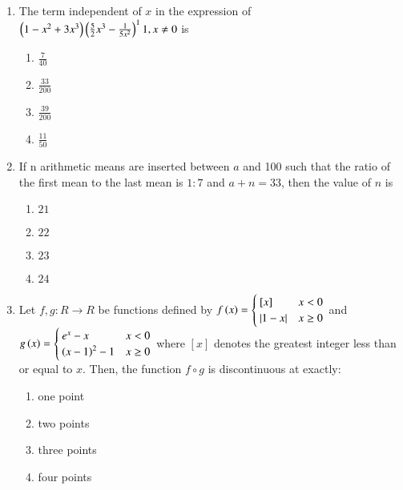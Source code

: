 \documentclass[journal]{IEEEtran}
\begin{document}
\begin{enumerate}
    \item The term independent of $x$ in the expression of $\left(1-x^2+3x^3\right)\left(\frac{5}{2}x^3-\frac{1}{5x^2}\right)^11,x\neq 0$ is

		\begin{multicols}{4}
			\begin{enumerate}
				\item $\frac{7}{40}$
				\item $\frac{33}{200}$
				\item $\frac{39}{200}$
				\item $\frac{11}{50}$
			\end{enumerate}
		\end{multicols}

    \item If n arithmetic means are inserted between $a$ and 100 such that the ratio of the first mean to the last mean is $1:7$ and $a+n=33$, then the value of $n$ is

		\begin{multicols}{4}
			\begin{enumerate}
				\item $21$
				\item $22$
				\item $23$
				\item $24$
			\end{enumerate}
		\end{multicols}
  
    \item Let $f,g:R\to R$ be functions defined by
        $f\left(x\right)=
        \begin{cases}
        \left[x\right] & x<0\\
        \left\vert1-x\right\vert & x\geq 0
        \end{cases}
        $ and 
        $g\left(x\right)=
        \begin{cases}
        e^x-x & x<0\\
        \left(x-1\right)^2-1 & x\geq0
        \end{cases}
        $ where $\left[x\right]$ denotes the greatest integer less than or equal to $x$. Then, the function $f\circ g$ is discontinuous at exactly:

        \begin{multicols}{4}
            \begin{enumerate}
                \item one point
                \item two points
                \item three points
                \item four points
            \end{enumerate}
        \end{multicols}


\end{enumerate}
\end{document}
